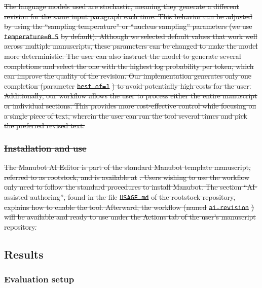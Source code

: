 \documentclass[
]{article}
\providecommand{\DIFdeltex}[1]{{\protect\color{red}\sout{#1}}}                      %
\providecommand{\DIFdelbegin}{} %
\providecommand{\DIFdelend}{} %
\providecommand{\DIFdel}[1]{\texorpdfstring{\DIFdeltex{#1}}{}} %
\newcommand{\DIFscaledelfig}{0.5}
\newlength{\DIFdelgraphicswidth} %
\newlength{\DIFdelgraphicsheight} %
\newcommand{\DIFdelincludegraphics}[2][]{%
\sbox{\DIFdelgraphicsbox}{\DIFOincludegraphics[#1]{#2}}%
\settoboxwidth{\DIFdelgraphicswidth}{\DIFdelgraphicsbox} %
\settoboxtotalheight{\DIFdelgraphicsheight}{\DIFdelgraphicsbox} %
\scalebox{\DIFscaledelfig}{%
\parbox[b]{\DIFdelgraphicswidth}{\usebox{\DIFdelgraphicsbox}\\[-\baselineskip] \rule{\DIFdelgraphicswidth}{0em}}\llap{\resizebox{\DIFdelgraphicswidth}{\DIFdelgraphicsheight}{%
\setlength{\unitlength}{\DIFdelgraphicswidth}%
\begin{picture}(1,1)%
\thicklines\linethickness{2pt} %
{\color[rgb]{1,0,0}\put(0,0){\framebox(1,1){}}}%
{\color[rgb]{1,0,0}\put(0,0){\line( 1,1){1}}}%
{\color[rgb]{1,0,0}\put(0,1){\line(1,-1){1}}}%
\end{picture}%
}\hspace*{3pt}}} %
} %
\DeclareRobustCommand{\DIFdelbegin}{\DIFOdelbegin \let\includegraphics\DIFdelincludegraphics} %
\DeclareRobustCommand{\DIFdelend}{\DIFOaddend \let\includegraphics\DIFOincludegraphics} %
\begin{document}
\DIFdelbegin \DIFdel{The language models used are stochastic, meaning they generate a different revision for the same input paragraph each time.
This behavior can be adjusted by using the ``sampling temperature'' or ``nucleus sampling'' parameters (we use }\texttt{\DIFdel{temperature=0.5}} %
\DIFdel{by default).
Although we selected default values that work well across multiple manuscripts, these parameters can be changed to make the model more deterministic.
The user can also instruct the model to generate several completions and select the one with the highest log probability per token, which can improve the quality of the revision.
Our implementation generates only one completion (parameter }\texttt{\DIFdel{best\_of=1}}%
\DIFdel{) to avoid potentially high costs for the user.
Additionally, our workflow allows the user to process either the entire manuscript or individual sections.
This provides more cost-effective control while focusing on a single piece of text, wherein the user can run the tool several times and pick the preferred revised text.
}%

\subsubsection{\DIFdel{Installation and use}}
\addtocounter{subsubsection}{-1}%

\DIFdel{The Manubot AI Editor is part of the standard Manubot template manuscript, referred to as rootstock, and is available at }%
\DIFdel{.
Users wishing to use the workflow only need to follow the standard procedures to install Manubot.
The section ``AI-assisted authoring'', found in the file }\texttt{\DIFdel{USAGE.md}} %
\DIFdel{of the rootstock repository, explains how to enable the tool.
Afterward, the workflow (named }\texttt{\DIFdel{ai-revision}}%
\DIFdel{) will be available and ready to use under the Actions tab of the user's manuscript repository.
}%

\DIFdelend \subsection{Results}

\subsubsection{Evaluation setup}
\end{document}
